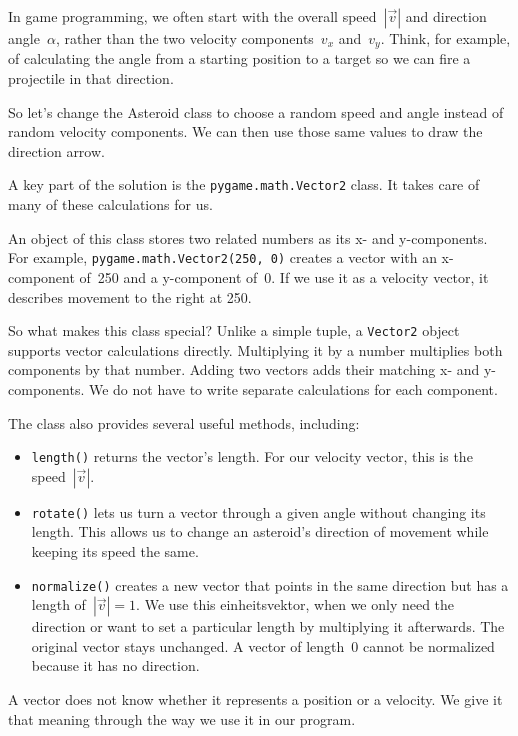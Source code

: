 In game programming, we often start with the overall speed~$|\vec v|$ and direction angle~$\alpha$, rather than the two velocity components~$v_x$ and~$v_y$. Think, for example, of calculating the angle from a starting position to a target so we can fire a projectile in that direction.

So let's change the Asteroid class to choose a random speed and angle instead of random velocity components. We can then use those same values to draw the direction arrow.

A key part of the solution is the \texttt{pygame.math.Vector2} class. It takes care of many of these calculations for us.

\begin{hintbox}
	An object of this class stores two related numbers as its x- and y-components. For example, \texttt{pygame.math.Vector2(250, 0)} creates a vector with an x-component of~250 and a y-component of~0. If we use it as a velocity vector, it describes movement to the right at \SI{250}{\pxsec}.
	
	So what makes this class special? Unlike a simple tuple, a \texttt{Vector2} object supports vector calculations directly. Multiplying it by a number multiplies both components by that number. Adding two vectors adds their matching x- and y-components. We do not have to write separate calculations for each component.
	
	The class also provides several useful methods, including:
	\begin{itemize}
		\item \texttt{length()} returns the vector's length. For our velocity vector, this is the speed~$|\vec v|$.
		\item \texttt{rotate()} lets us turn a vector through a given angle without changing its length. This allows us to change an asteroid's direction of movement while keeping its speed the same.
		\item \texttt{normalize()} creates a new vector that points in the same direction but has a length of~$|\vec v| = 1$. We use this \gls{einheitsvektor}, when we only need the direction or want to set a particular length by multiplying it afterwards. The original vector stays unchanged. A vector of length~0 cannot be normalized because it has no direction.
	\end{itemize}
	
	A vector does not know whether it represents a position or a velocity. We give it that meaning through the way we use it in our program.
\end{hintbox}

